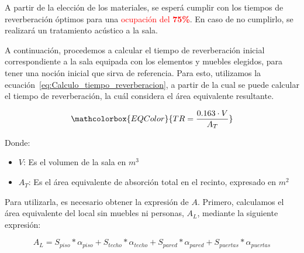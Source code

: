 
\par A partir de la elección de los materiales, se esperá cumplir con los tiempos de reverberación óptimos para una  \textcolor{red}{ocupación del \textbf{75\%}}. En caso de no cumplirlo, se realizará un tratamiento acústico a la sala.\\

\par A continuación, procedemos a calcular el tiempo de reverberación inicial correspondiente a la sala equipada con los elementos y muebles elegidos, para tener una noción inicial que sirva de referencia. Para esto, utilizamos la ecuación~\eqref{eq:Calculo_tiempo_reverberacion}, a partir de la cual se puede  calcular el tiempo de reverberación, la cuál considera el área equivalente resultante.

\begin{equation}
   \mathcolorbox{EQColor}{  TR = \frac{0.163 \cdot V}{A_T} }
    \label{eq:Calculo_tiempo_reverberacion}
\end{equation}

Donde:
\begin{itemize}
    \item $V$: Es el volumen de la sala en $m^3$
    \item $A_T$: Es el área equivalente de absorción total en el recinto, expresado en $m^2$
\end{itemize}

\par Para utilizarla, es necesario obtener la expresión de $A$. Primero, calculamos el área equivalente del local sin muebles ni personas, $A_L$, mediante la siguiente expresión:

\begin{equation}
    A_L = S_{piso} * \alpha_{piso} +S_{techo} * \alpha_{techo} + S_{pared} * \alpha_{pared} + S_{puertas} * \alpha_{puertas}
\end{equation}

